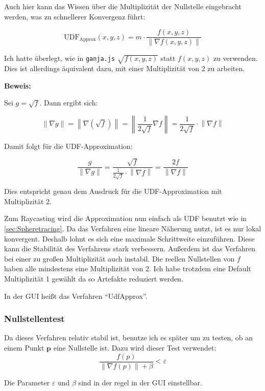\documentclass[
	ngerman,%
	accentcolor=9c,%
	ruledheaders=section,%
	class=report,%
	thesis={type=bachelor},%
	fontsize=11pt,%
	parskip=half-,%
	custommargins=true,%
	marginpar=false,%
]{tudapub}
\begin{document}
Auch hier kann das Wissen über die Multiplizität der Nullstelle eingebracht werden, was zu schnellerer Konvergenz führt:

\[
\text{UDF}_\text{Approx}(x, y, z) = m \cdot \frac{f(x, y, z)}{\|\nabla f(x, y, z)\|}
\]


Ich hatte überlegt, wie in \texttt{ganja.js} \( \sqrt{f(x, y, z)} \) statt \( f(x, y, z) \) zu verwenden.  
Dies ist allerdings äquivalent dazu, mit einer Multiplizität von 2 zu arbeiten.

\textbf{Beweis:}

Sei \( g = \sqrt{f} \). Dann ergibt sich:

\[
\left\lVert \nabla g \right\rVert = \left\lVert \nabla(\sqrt{f}) \right\rVert 
= \left\lVert \frac{1}{2 \sqrt{f}} \nabla f \right\rVert 
= \frac{1}{2 \sqrt{f}} \cdot \left\lVert \nabla f \right\rVert
\]

Damit folgt für die UDF-Approximation:

\[
\frac{g}{\left\lVert \nabla g \right\rVert} 
= \frac{\sqrt{f}}{\frac{1}{2 \sqrt{f}} \cdot \left\lVert \nabla f \right\rVert} 
= \frac{2f}{\left\lVert \nabla f \right\rVert}
\]

Dies entspricht genau dem Ausdruck für die UDF-Approximation mit Multiplizität 2.


Zum Raycasting wird die Approximation nun einfach als UDF benutzt wie in \ref{sec:Spheretracing}. 
Da das Verfahren eine lineare Näherung nutzt, ist es nur lokal konvergent. Deshalb lohnt es sich eine maximale Schrittweite einzuführen. Diese kann die Stabilität des Verfahrens stark verbessern. Außerdem ist das Verfahren bei einer zu großen Multiplizität auch instabil.  Die reellen Nullstellen von \(f\) haben alle mindestens eine Multiplizität von 2. 
Ich habe trotzdem eine Default Multiplizität 1 gewählt da so Artefakte reduziert werden.


In der GUI heißt das Verfahren \enquote{UdfApprox}.
\subsubsection{Nullstellentest}
\label{sec:Nullstellentest}
Da dieses Verfahren relativ stabil ist, benutze ich es später um zu testen, ob an einem Punkt \(\mathbf{p}\) eine Nullstelle ist. Dazu wird dieser Test verwendet:
\[
\frac{f(p)}{\|\nabla f(p)\|+\beta} < \varepsilon
\]

Die Parameter \(\varepsilon\) und \(\beta\) sind in der regel in der GUI einstellbar.
\end{document}
